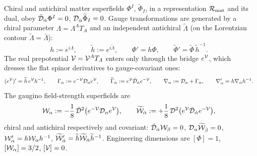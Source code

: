 Chiral and antichiral matter superfields $\Phi^I$, $\widetilde\Phi_I$, in a representation $\mathcal R_{\rm mat}$ and its dual, obey $\bar{\mathcal{D}}_{\dot\alpha}\Phi^I=0$, $\mathcal{D}_\alpha\widetilde\Phi_I=0$. Gauge transformations are generated by a chiral parameter $\Lambda=\Lambda^AT_A$ and an independent antichiral $\widetilde\Lambda$ (on the Lorentzian contour $\widetilde\Lambda=\bar\Lambda$):
\begin{equation}
h:=e^{i\Lambda},\qquad \widetilde h:=e^{i\widetilde\Lambda},\qquad \Phi'=h\Phi,\qquad \widetilde\Phi'=\widetilde\Phi\,\widetilde h^{-1}.
\end{equation}
The real prepotential $\mathcal{V}=\mathcal{V}^AT_A$ enters only through the bridge $e^{\mathcal{V}}$, which dresses the flat spinor derivatives to gauge-covariant ones:
\begin{equation}\label{eq:gaugebv:bridge}
(e^{\mathcal{V}})'=\widetilde h\,e^{\mathcal{V}}h^{-1},\qquad
\Gamma_\alpha:=e^{-\mathcal{V}}\mathcal{D}_\alpha e^{\mathcal{V}},\qquad
\widetilde\Gamma_{\dot\alpha}:=e^{\mathcal{V}}\bar{\mathcal{D}}_{\dot\alpha}e^{-\mathcal{V}},\qquad
\nabla_\alpha:=\mathcal{D}_\alpha+\Gamma_\alpha,\qquad
\nabla'_\alpha=h\nabla_\alpha h^{-1}.
\end{equation}
The gaugino field-strength superfields are
\begin{equation}\label{eq:gaugebv:W}
\mathcal{W}_\alpha:=-\frac18\,\bar{\mathcal{D}}^2\bigl(e^{-\mathcal{V}}\mathcal{D}_\alpha e^{\mathcal{V}}\bigr),\qquad
\widetilde{\mathcal{W}}_{\dot\alpha}:=+\frac18\,\mathcal{D}^2\bigl(e^{\mathcal{V}}\bar{\mathcal{D}}_{\dot\alpha}e^{-\mathcal{V}}\bigr),
\end{equation}
chiral and antichiral respectively and covariant: $\bar{\mathcal{D}}_{\dot\alpha}\mathcal{W}_\beta=0$, $\mathcal{D}_\alpha\widetilde{\mathcal{W}}_{\dot\beta}=0$, $\mathcal{W}'_\alpha=h\mathcal{W}_\alpha h^{-1}$, $\widetilde{\mathcal{W}}'_{\dot\alpha}=\widetilde h\widetilde{\mathcal{W}}_{\dot\alpha}\widetilde h^{-1}$. Engineering dimensions are $[\Phi]=1$, $[\mathcal{W}_\alpha]=3/2$, $[\mathcal{V}]=0$.

